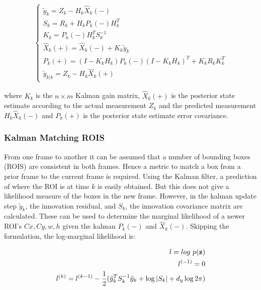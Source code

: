 \documentclass[a4paper,11pt,notitlepage]{article}
\begin{document}
\begin{equation}
\begin{aligned}
\begin{cases}
\label{kalman_update_equs}
\tilde{y}_{k} = Z_{k} - H_{k} \hat{X}_{k}(-) \\
S_{k} = R_{k} + H_{k}P_{k}(-)H_{k}^{T} \\
K_{k} = P_{k}(-) H_{k}^{T} S_{k}^{-1} \\ 
\hat{X}_{k}(+) = \hat{X}_{k}(-) + K_{k} \tilde{y}_{k}\\
P_{k}(+) = (I-K_{k}H_{k}) P_{k}(-)(I-K_{k}H_{k})^{T} + K_{k}R_{k}K_{k}^{T} \\
\tilde{y}_{k|k} = Z_{k} - H_{k} \hat{X}_{k}(+)

\end{cases}
\end{aligned}
\end{equation}

where $K_{k}$ is the $n \times m$ Kalman gain matrix, $\hat{X}_{k}(+)$ is the posterior state estimate according to the actual measurement $Z_{k}$ and the predicted measurement $H_{k} \hat{X}_{k}(-)$ and $P_{k}(+)$ is the posterior state estimate error covariance.

\subsubsection{Kalman Matching ROIS}

From one frame to another it can be assumed that a number of bounding boxes (ROIS) are consistent in both frames. Hence a metric to match a box from a prior frame to the current frame is required. Using the Kalman filter, a prediction of where the ROI is at time $k$ is easily obtained. But this does not give a likelihood measure of the boxes in the new frame. However, in the kalman update step $\tilde{y}_{k}$, the innovation residual, and $S_{k}$, the innovation covariance matrix are calculated. These can be used to determine the marginal likelihood of a newer ROI's $Cx,Cy,w,h$ given the kalman $P_{k}(-)$ and $\hat{X}_{k}(-)$. Skipping the formulation, the log-marginal likelihood is:

\begin{equation}
\begin{aligned}
l = log \textnormal{ } p(\mathbf{z}) \\
l^{(-1)} = 0 \\
l^{(k)} = l^{(k-1)} - \frac{1}{2} (\tilde{y}_{k}^{T}S_{k}^{-1}\tilde{y}_{k} + \log |S_{k}| + d_{y}\log 2 \pi) 
\end{aligned}
\end{equation}
\end{document}
